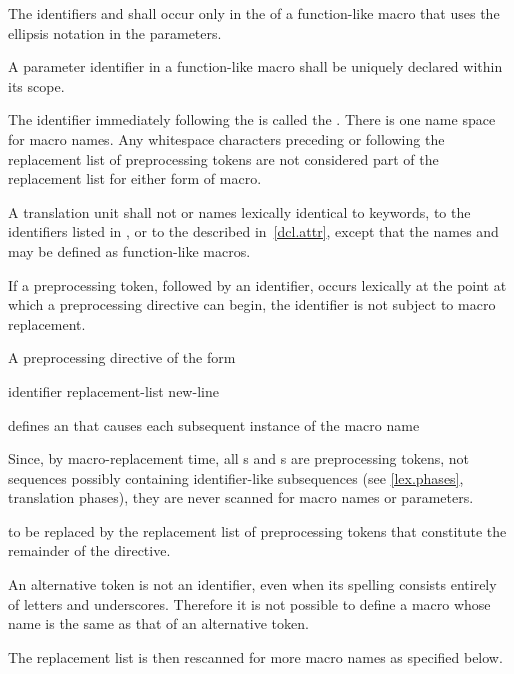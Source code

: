 \pnum
{}%
%
The identifiers  and 
shall occur only in the 
of a function-like macro that uses the ellipsis notation in the parameters.

\pnum
A parameter identifier in a function-like macro
shall be uniquely declared within its scope.

\pnum
The identifier immediately following the
is called the
%
.
There is one name space for macro names.
Any whitespace characters preceding or following the
replacement list of preprocessing tokens are not considered
part of the replacement list for either form of macro.

\pnum
{}%
A translation unit shall not  or 
names lexically identical
to keywords,
to the identifiers listed in , or
to the  described in~\ref{dcl.attr},
except that the names  and  may be
defined as function-like macros.

\pnum
If a
\tcode{\#}
preprocessing token,
followed by an identifier,
occurs lexically
at the point at which a preprocessing directive can begin,
the identifier is not subject to macro replacement.

\pnum
A preprocessing directive of the form
\begin{ncsimplebnf}
 identifier replacement-list new-line
%
\end{ncsimplebnf}
defines an
 that
causes each subsequent instance of the macro name
\begin{footnote}
Since, by macro-replacement time,
all s and s are preprocessing tokens,
not sequences possibly containing identifier-like subsequences
(see \ref{lex.phases}, translation phases),
they are never scanned for macro names or parameters.
\end{footnote}
to be replaced by the replacement list of preprocessing tokens
that constitute the remainder of the directive.
\begin{footnote}
An alternative token is not an identifier,
even when its spelling consists entirely of letters and underscores.
Therefore it is not possible to define a macro
whose name is the same as that of an alternative token.
\end{footnote}
The replacement list is then rescanned for more macro names as
specified below.

